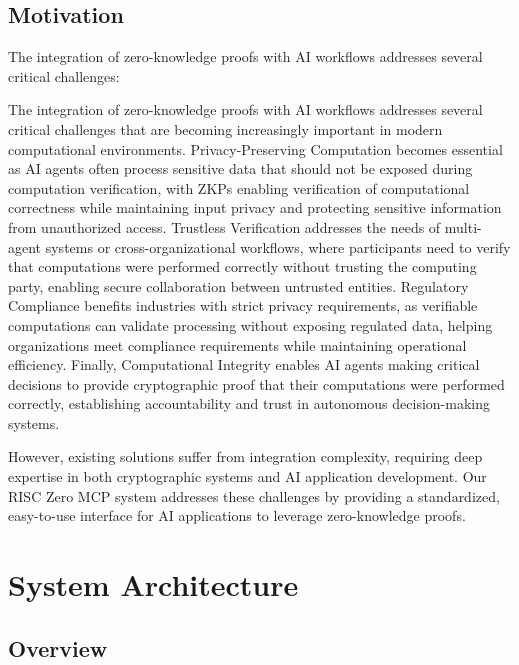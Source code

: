 \documentclass[11pt]{article}
\begin{document}
\subsection{Motivation}

The integration of zero-knowledge proofs with AI workflows addresses several critical challenges:

The integration of zero-knowledge proofs with AI workflows addresses several critical challenges that are becoming increasingly important in modern computational environments. Privacy-Preserving Computation becomes essential as AI agents often process sensitive data that should not be exposed during computation verification, with ZKPs enabling verification of computational correctness while maintaining input privacy and protecting sensitive information from unauthorized access. Trustless Verification addresses the needs of multi-agent systems or cross-organizational workflows, where participants need to verify that computations were performed correctly without trusting the computing party, enabling secure collaboration between untrusted entities. Regulatory Compliance benefits industries with strict privacy requirements, as verifiable computations can validate processing without exposing regulated data, helping organizations meet compliance requirements while maintaining operational efficiency. Finally, Computational Integrity enables AI agents making critical decisions to provide cryptographic proof that their computations were performed correctly, establishing accountability and trust in autonomous decision-making systems.

However, existing solutions suffer from integration complexity, requiring deep expertise in both cryptographic systems and AI application development. Our RISC Zero MCP system addresses these challenges by providing a standardized, easy-to-use interface for AI applications to leverage zero-knowledge proofs.

\section{System Architecture}
\label{sec:architecture}

\subsection{Overview}
\end{document}
